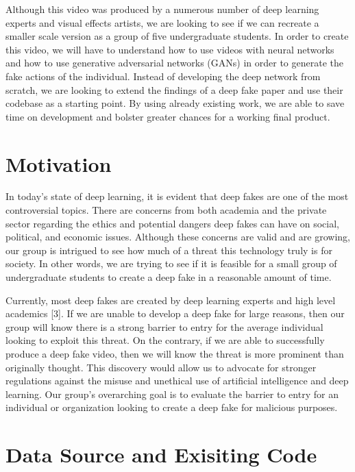 \documentclass{article}
\begin{document}
Although this video was produced by a numerous number of deep learning experts and visual effects artists, we are looking to see if we can recreate a smaller scale version as a group of five undergraduate students. In order to create this video, we will have to understand how to use videos with neural networks and how to use generative adversarial networks (GANs) in order to generate the fake actions of the individual. Instead of developing the deep network from scratch, we are looking to extend the findings of a deep fake paper and use their codebase as a starting point. By using already existing work, we are able to save time on development and bolster greater chances for a working final product. 



\section{Motivation}
\label{gen_inst}

In today’s state of deep learning, it is evident that deep fakes are one of the most controversial topics. There are concerns from both academia and the private sector regarding the ethics and potential dangers deep fakes can have on social, political, and economic issues. Although these concerns are valid and are growing, our group is intrigued to see how much of a threat this technology truly is for society. In other words, we are trying to see if it is feasible for a small group of undergraduate students to create a deep fake in a reasonable amount of time. 

Currently, most deep fakes are created by deep learning experts and high level academics [3]. If we are unable to develop a deep fake for large reasons, then our group will know there is a strong barrier to entry for the average individual looking to exploit this threat. On the contrary, if we are able to successfully produce a deep fake video, then we will know the threat is more prominent than originally thought. This discovery would allow us to advocate for stronger regulations against the misuse and unethical use of artificial intelligence and deep learning. Our group’s overarching goal is to evaluate the barrier to entry for an individual or organization looking to create a deep fake for malicious purposes. 


\section{Data Source and Exisiting Code}
\label{headings}
\end{document}
